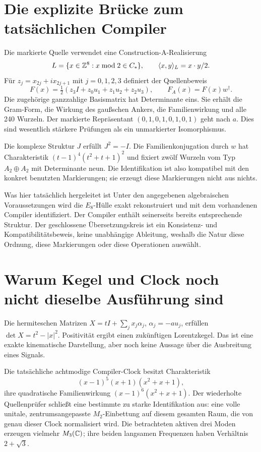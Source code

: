 \section{Die explizite Brücke zum tatsächlichen Compiler}
Die markierte Quelle verwendet eine Construction-A-Realisierung
\begin{equation}
L=\{x\in\mathbb Z^8:x\bmod2\in C_*\},\qquad\langle x,y\rangle_L=x\cdot y/2.
\end{equation}
Für $z_j=x_{2j}+ix_{2j+1}$ mit $j=0,1,2,3$ definiert der Quellenbeweis
\begin{equation}
F(x)=\tfrac12(z_3I+z_0u_1+z_1u_2+z_2u_3),\qquad F_A(x)=F(x)w^\dagger.
\end{equation}
Die zugehörige ganzzahlige Basismatrix hat Determinante eins. Sie erhält die Gram-Form, die Wirkung des gaußschen Ankers, die Familienwirkung und alle 240 Wurzeln. Der markierte Repräsentant $(0,1,0,1,0,1,0,1)$ geht nach $a$. Dies sind wesentlich stärkere Prüfungen als ein unmarkierter Isomorphismus.

Die komplexe Struktur $J$ erfüllt $J^2=-I$. Die Familienkonjugation durch $w$ hat Charakteristik $(t-1)^4(t^2+t+1)^2$ und fixiert zwölf Wurzeln vom Typ $A_2\oplus A_2$ mit Determinante neun. Die Identifikation ist also kompatibel mit den konkret benutzten Markierungen; sie erzeugt diese Markierungen nicht aus nichts.

\begin{grenze}{Was hier tatsächlich hergeleitet ist}
Unter den angegebenen algebraischen Voraussetzungen wird die $E_8$-Hülle exakt rekonstruiert und mit dem vorhandenen Compiler identifiziert. Der Compiler enthält seinerseits bereits entsprechende Struktur. Der geschlossene Übersetzungskreis ist ein Konsistenz- und Kompatibilitätsbeweis, keine unabhängige Ableitung, weshalb die Natur diese Ordnung, diese Markierungen oder diese Operationen auswählt.
\end{grenze}

\section{Warum Kegel und Clock noch nicht dieselbe Ausführung sind}
Die hermiteschen Matrizen $X=tI+\sum_jx_j\alpha_j$, $\alpha_j=-au_j$, erfüllen $\det X=t^2-|x|^2$. Positivität ergibt einen zukünftigen Lorentzkegel. Das ist eine exakte kinematische Darstellung, aber noch keine Aussage über die Ausbreitung eines Signals.

Die tatsächliche achtmodige Compiler-Clock besitzt Charakteristik
\begin{equation}
(x-1)^5(x+1)(x^2+x+1),
\end{equation}
ihre quadratische Familienwirkung $(x-1)^6(x^2+x+1)$. Der wiederholte Quellenprüfer schließt eine bestimmte zu starke Identifikation aus: eine volle unitale, zentrumsangepasste $M_2$-Einbettung auf diesem gesamten Raum, die von genau dieser Clock normalisiert wird. Die betrachteten aktiven drei Moden erzeugen vielmehr $M_3(\mathbb C)$; ihre beiden langsamen Frequenzen haben Verhältnis $2+\sqrt3$.

